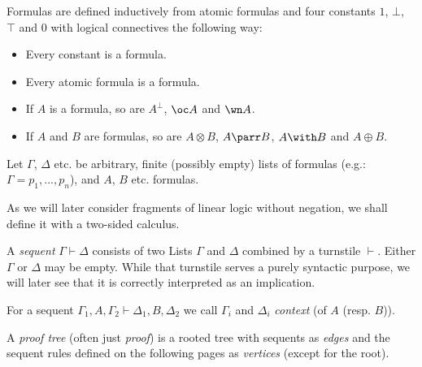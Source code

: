 \documentclass[DIN, pagenumber=false, fontsize=11pt, parskip=half, colorinlistoftodos, svgnames]{scrartcl}
\begin{document}
	\begin{definition}[Formula]
		Formulas are defined inductively from atomic formulas and four constants $1$, $\bot$, $\top$ and $0$ with logical  connectives the following way:
		\begin{itemize}
			\item Every constant is a formula.
			\item Every atomic formula is a formula.
			\item If $A$ is a formula, so are $A^\bot$,  $\oc A$ and $\wn A$.
			\item If $A$ and $B$ are formulas, so are $A \otimes B$, $A \parr B$, $A \with B$ and $A \oplus B$.
		\end{itemize}
	\end{definition}
	
	Let $\Gamma $, $\Delta$ etc. be arbitrary, finite (possibly empty) lists of formulas (e.g.: $\Gamma = p_1, ..., p_n$), and $A$, $B$ etc. formulas.
	
	As we will later consider fragments of linear logic without negation, we shall define it with a two-sided calculus. 
	
	\begin{definition}[Sequent]
		A \emph{sequent} $\Gamma \vdash \Delta $ consists of two Lists $\Gamma$ and $\Delta$ combined by a turnstile $\vdash$. 
		Either $\Gamma$ or $\Delta$ may be empty. 
		While that turnstile serves a purely syntactic purpose, we will later see that it is correctly interpreted as an implication.
		
		For a sequent $\Gamma_1, A, \Gamma_2 \vdash \Delta_1, B, \Delta_2$ we call $\Gamma_i$ and $\Delta_i$ \emph{context} (of $A$ (resp. $B$)).
	\end{definition}
	
	\begin{definition}
		A \emph{proof tree} (often just \emph{proof}) is a rooted tree with sequents as \emph{edges} and the sequent rules defined on the following pages as \emph{vertices} (except for the root).
	\end{definition}
	
\end{document}
